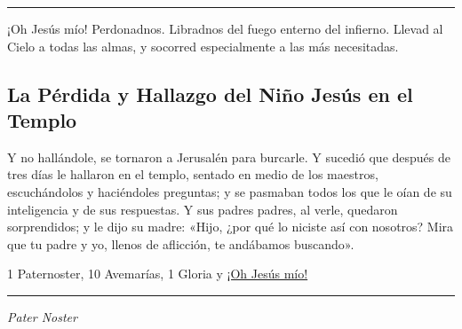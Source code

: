 \documentclass[a4paper,11pt, oneside]{report}
\begin{document}
\begin{center}\rule{1\linewidth}{\linethickness}\end{center}

\medskip
\hypertarget{finalPresentacion}{¡Oh Jesús mío! Perdonadnos. Libradnos del fuego enterno del infierno. Llevad al Cielo a todas las almas, y socorred especialmente a las más 
necesitadas.} 
              
\subsection*{La Pérdida y Hallazgo del Niño Jesús en el Templo}

Y no hallándole, se tornaron a Jerusalén para burcarle. Y sucedió que después de tres días le hallaron en el templo, sentado en medio de los maestros,
escuchándolos y haciéndoles preguntas; y se pasmaban todos los que le oían de su inteligencia y de sus respuestas. Y sus padres padres, al verle, quedaron  
sorprendidos; y le dijo su madre: «Hijo, ¿por qué lo niciste así con nosotros? Mira que tu padre y yo, llenos de aflicción, te andábamos buscando».

\medskip

1 Paternoster, 10 Avemarías, 1 Gloria y \hyperlink{finalPerdida}{¡Oh Jesús mío!}

\medskip

\begin{center}\rule{1\linewidth}{\linethickness}\end{center}

\medskip
\textit{Pater Noster}
\end{document}
